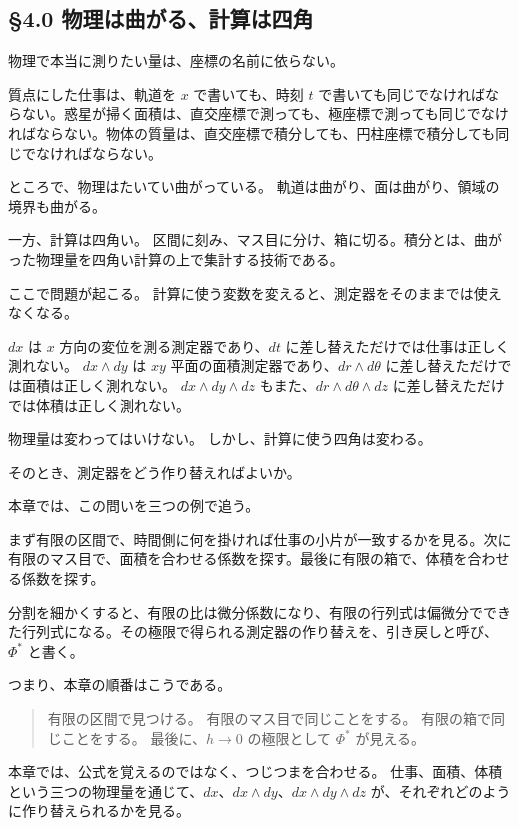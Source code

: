 \documentclass[a4paper,12pt,openany]{book}
\begin{document}
\hypertarget{ux7269ux7406ux306fux66f2ux304cux308bux8a08ux7b97ux306fux56dbux89d2}{%
\subsection{§4.0
物理は曲がる、計算は四角}\label{ux7269ux7406ux306fux66f2ux304cux308bux8a08ux7b97ux306fux56dbux89d2}}

物理で本当に測りたい量は、座標の名前に依らない。

質点にした仕事は、軌道を \(x\) で書いても、時刻 \(t\)
で書いても同じでなければならない。惑星が掃く面積は、直交座標で測っても、極座標で測っても同じでなければならない。物体の質量は、直交座標で積分しても、円柱座標で積分しても同じでなければならない。

ところで、物理はたいてい曲がっている。
軌道は曲がり、面は曲がり、領域の境界も曲がる。

一方、計算は四角い。
区間に刻み、マス目に分け、箱に切る。積分とは、曲がった物理量を四角い計算の上で集計する技術である。

ここで問題が起こる。
計算に使う変数を変えると、測定器をそのままでは使えなくなる。

\(dx\) は \(x\) 方向の変位を測る測定器であり、\(dt\)
に差し替えただけでは仕事は正しく測れない。 \(dx \wedge dy\) は \(xy\)
平面の面積測定器であり、\(dr \wedge d\theta\)
に差し替えただけでは面積は正しく測れない。 \(dx \wedge dy \wedge dz\)
もまた、\(dr \wedge d\theta \wedge dz\)
に差し替えただけでは体積は正しく測れない。

物理量は変わってはいけない。 しかし、計算に使う四角は変わる。

そのとき、測定器をどう作り替えればよいか。

本章では、この問いを三つの例で追う。

まず有限の区間で、時間側に何を掛ければ仕事の小片が一致するかを見る。次に有限のマス目で、面積を合わせる係数を探す。最後に有限の箱で、体積を合わせる係数を探す。

分割を細かくすると、有限の比は微分係数になり、有限の行列式は偏微分でできた行列式になる。その極限で得られる測定器の作り替えを、引き戻しと呼び、\(\Phi^*\)
と書く。

つまり、本章の順番はこうである。

\begin{quote}
有限の区間で見つける。 有限のマス目で同じことをする。
有限の箱で同じことをする。 最後に、\(h\to0\) の極限として \(\Phi^*\)
が見える。
\end{quote}

本章では、公式を覚えるのではなく、つじつまを合わせる。
仕事、面積、体積という三つの物理量を通じて、\(dx\)、\(dx \wedge dy\)、\(dx \wedge dy \wedge dz\)
が、それぞれどのように作り替えられるかを見る。
\end{document}

